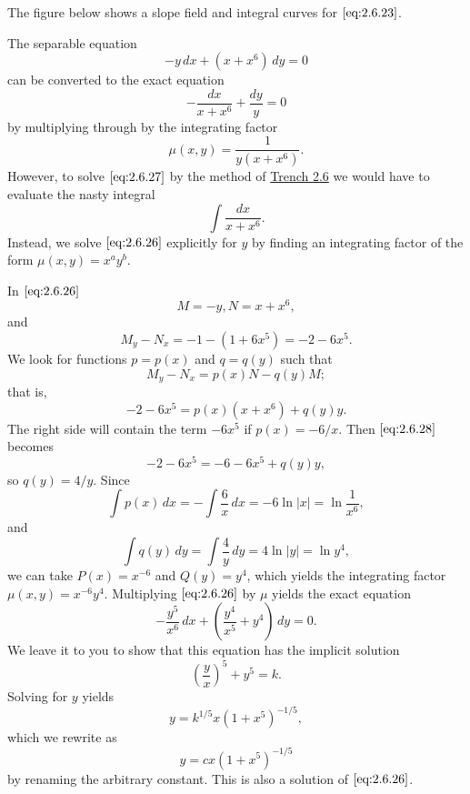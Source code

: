 \documentclass{ximera}
\begin{document}
\begin{example}
\begin{explanation}
The figure below shows a slope field and integral curves for
$\eqref{eq:2.6.23}$.


\begin{center}
\end{center}


\end{explanation}
\end{example}


\begin{example}\label{example:2.6.4}
The separable  equation
\begin{equation}\label{eq:2.6.26}
-y\,dx+(x+x^6)\,dy=0
\end{equation}
can be converted to the exact equation
\begin{equation} \label{eq:2.6.27}
-\frac{dx}{x+x^6}+\frac{dy}{y}=0
\end{equation}
by multiplying through
by the  integrating factor
$$
\mu(x,y)=\frac{1}{y(x+x^6)}.
$$
However, to solve $\eqref{eq:2.6.27}$ by the method of \href{https://xerxes.ximera.org/differentialequations/main/exactEquations/exactEquations}{Trench 2.6}
we would have to evaluate the nasty integral
$$
\int \frac{dx}{x+x^6}.
$$
Instead, we solve $\eqref{eq:2.6.26}$ explicitly for $y$ by finding  an
integrating factor of the form
$\mu(x,y)=x^ay^b$.

In $\eqref{eq:2.6.26}$
$$
M=-y, N=x+x^6,
$$
and
$$
M_y-N_x=-1-(1+6x^5)=-2-6x^5.
$$
We  look for functions
$p=p(x)$ and $q=q(y)$ such that
$$
M_y-N_x=p(x)N-q(y)M;
$$
that is,
\begin{equation}\label{eq:2.6.28}
-2-6x^5=p(x)(x+x^6)+q(y)y.
\end{equation}
The right side will contain the term $-6x^5$ if $p(x)=-6/x$.   Then
$\eqref{eq:2.6.28}$ becomes
$$
-2-6x^5=-6-6x^5+q(y)y,
$$
so  $q(y)=4/y$.  Since
$$
\int p(x)\,dx=-\int\frac{6}{x}\,dx=-6\ln|x|=\ln\frac{1}{x^6},
$$
 and
$$
\int q(y)\,dy=\int\frac{4}{y}\,dy=4\ln
|y|=\ln{y^4},
$$
we can take $P(x)=x^{-6}$ and $Q(y)=y^4$,
which yields the integrating factor $\mu(x,y)=x^{-6}y^4$.
Multiplying $\eqref{eq:2.6.26}$ by  $\mu$ yields the exact equation
$$
-\frac{y^5}{x^6}\,dx+\left(\frac{y^4}{x^5}+y^4\right)
\,dy=0.
$$
 We leave it to you to 
show that this equation has the implicit solution 
$$
\left(\frac{y}{x}\right)^5+y^5=k.
$$
 Solving for $y$ yields
$$
y=k^{1/5}x(1+x^5)^{-1/5},
$$
which we rewrite as
$$
y=cx(1+x^5)^{-1/5}
$$
by renaming the arbitrary constant.
This is also a solution of $\eqref{eq:2.6.26}$.


\end{example}
\end{document}
